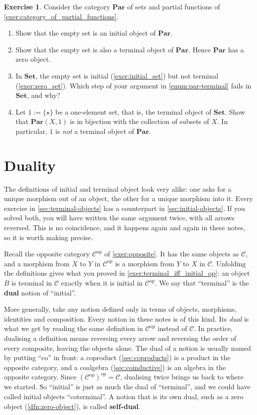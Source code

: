 \documentclass[a4paper,11pt, oneside,titlepage=false]{scrbook}
\theoremstyle{plain}
\theoremstyle{definition}
\newtheorem{exer}[thm]{Exercise}
\newcommand{\Cat}[1]{\mathcal{#1}}
\newcommand{\CC}{\Cat{C}}
\newcommand{\Catb}[1]{\mathbf{#1}}
\newcommand{\SET}{\Catb{Set}}
\newcommand{\PAR}{\Catb{Par}}
\newcommand{\CHom}[3]{{#1}(#2,#3)}
\newcommand{\op}[1]{\ensuremath{{#1}^\text{op}}}
\begin{document}
\begin{exer}\label{exer:zero_par}
  Consider the category $\PAR$ of sets and partial functions of
  \cref{exer:category_of_partial_functions}.
  \begin{enumerate}
  \item Show that the empty set is an initial object of $\PAR$.
  \item \label{enum:par-terminal}
    Show that the empty set is also a terminal object of $\PAR$.
    Hence $\PAR$ has a zero object.
  \item In $\SET$, the empty set is initial (\cref{exer:initial_set}) but not
    terminal (\cref{exer:zero_set}).
    Which step of your argument in \cref{enum:par-terminal} fails in $\SET$, and
    why?
  \item Let $1 := \{\star\}$ be a one-element set, that is, the terminal object
    of $\SET$.
    Show that $\CHom{\PAR}{X}{1}$ is in bijection with the collection of subsets
    of $X$.
    In particular, $1$ is \emph{not} a terminal object of $\PAR$.
  \end{enumerate}
\end{exer}


\section{Duality}
\label{sec:duality}

The definitions of initial and terminal object look very alike: one asks for a
unique morphism out of an object, the other for a unique morphism into it.
Every exercise in \cref{sec:terminal-objects} has a counterpart in
\cref{sec:initial-objects}.
If you solved both, you will have written the same argument twice, with all
arrows reversed.
This is no coincidence, and it happens again and again in these notes, so it is
worth making precise.

Recall the opposite category $\op\CC$ of \cref{exer:opposite}.
It has the same objects as $\CC$, and a morphism from $X$ to $Y$ in $\op\CC$ is
a morphism from $Y$ to $X$ in $\CC$.
Unfolding the definitions gives what you proved in
\cref{exer:terminal_iff_initial_op}: an object $B$ is terminal in $\CC$ exactly
when it is initial in $\op\CC$.
We say that ``terminal'' is the \textbf{dual} notion of ``initial''.

More generally, take any notion defined only in terms of objects, morphisms,
identities and composition.
Every notion in these notes is of this kind.
Its \emph{dual} is what we get by reading the same definition in $\op\CC$
instead of $\CC$.
In practice, dualising a definition means reversing every arrow and reversing
the order of every composite, leaving the objects alone.
The dual of a notion is usually named by putting ``co'' in front: a coproduct
(\cref{sec:coproducts}) is a product in the opposite category, and a coalgebra
(\cref{sec:coinductive}) is an algebra in the opposite category.
Since $\op{(\op\CC)} = \CC$, dualising twice brings us back to where we
started.
So ``initial'' is just as much the dual of ``terminal'', and we could have
called initial objects ``coterminal''.
A notion that is its own dual, such as a zero object
(\cref{dfn:zero-object}), is called \textbf{self-dual}.
\end{document}
